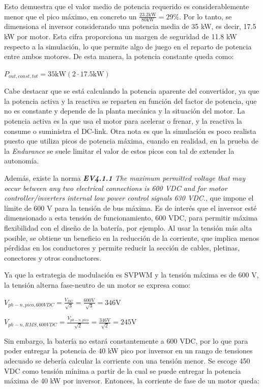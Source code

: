 Esto demuestra que el valor medio de potencia requerido es considerablemente menor que el pico máximo, en concreto un \(\frac{23.2 \text{kW}}{80 \text{kW}} = 29\%\). Por lo tanto, se dimensiona el inversor considerando una potencia media de 35 kW, es decir, 17.5 kW por motor. Esta cifra proporciona un margen de seguridad de 11.8 kW respecto a la simulación, lo que permite algo de juego en el reparto de potencia entre ambos motores. De esta manera, la potencia constante queda como:

\(P_{out, const, tot} = 35 \text{kW} (2 \cdot 17.5 \text{kW})\)

Cabe destacar que se está calculando la potencia aparente del convertidor, ya que la potencia activa y la reactiva se reparten en función del factor de potencia, que no es constante y depende de la planta mecánica y la situación del motor. La potencia activa es la que usa el motor para acelerar o frenar, y la reactiva la consume o suministra el DC-link. Otra nota es que la simulación es poco realista puesto que utiliza picos de potencia máxima, cuando en realidad, en la prueba de la \textit{Endurance} se suele limitar el valor de estos picos con tal de extender la autonomía.

Además, existe la norma \textit{\textbf{EV4.1.1} The maximum permitted voltage that may occur between any two electrical connections is 600 VDC and for motor controller/inverters internal low power control signals 630 VDC.}, que impone el límite de 600 V para la tensión de bus máxima. Es de interés que el inversor esté dimensionado a esta tensión de funcionamiento, 600 VDC, para permitir máxima flexibilidad con el diseño de la batería, por ejemplo. Al usar la tensión más alta posible, se obtiene un beneficio en la reducción de la corriente, que implica menos pérdidas en los conductores y permite reducir la sección de cables, pletinas, conectores y otros conductores.

Ya que la estrategia de modulación es SVPWM y la tensión máxima es de 600 V, la tensión alterna fase-neutro de un motor se expresa como:

\(V_{ph-n, pico, 600 VDC} = \frac{V_{DC}}{\sqrt{3}} = \frac{600 \text{V}}{\sqrt{3}} = 346 \text{V}\)

\(V_{ph-n, RMS, 600 VDC} = \frac{V_{ph-n, pico}}{\sqrt{2}} = \frac{346 \text{V}}{\sqrt{2}} = 245 \text{V}\)

Sin embargo, la batería no estará constantemente a 600 VDC, por lo que para poder entregar la potencia de 40 kW pico por inversor en un rango de tensiones adecuado se debería calcular la corriente con una tensión menor. Se escoge 450 VDC como tensión mínima a partir de la cual se puede entregar la potencia máxima de 40 kW por inversor. Entonces, la corriente de fase de un motor queda:

